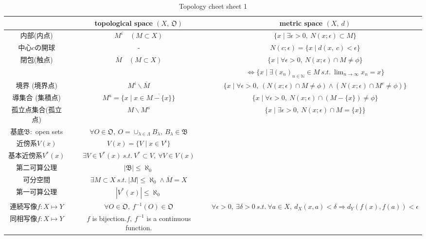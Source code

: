 \documentclass[b4paper,landscape,english,dvipdfmx]{jsarticle}
\begin{document}
\begin{table}[h]
    \caption{Topology cheet sheet 1}
    \begin{center}
    \begin{tabular}{|c||c|c|} \hline
    & topological space $( X,\ \mathfrak{O})$ & metric space $( X,\ d)$ \\ \hline
    内部(内点) & $M^i \quad ( M \subset X )$ & $\{ x \mid \exists \epsilon > 0,\ N(x;\epsilon) \subset M \}$ \\ \hline
    中心$c$の開球 & - & $N(c;\epsilon) = \{ x \mid d(x,\ c) < \epsilon \}$\\ \hline
    \multirow{2}{*}{閉包(触点)} & \multirow{2}{*}{$\overline{M} \quad ( M \subset X )$} & $ \{ x \mid \forall \epsilon > 0,\ N(x;\epsilon) \cap M \neq \phi \}$ \\
    & & $ \Leftrightarrow \{ x \mid \exists (x_n)_{n \in \mathbb{N}} \in M \ s.t. \ \lim_{n \to \infty} x_n = x \}$ \\ \hline
    境界 (境界点) & $M^i \backslash \overline{M}$ & $\{ x \mid \forall \epsilon > 0,\ (N(x;\epsilon) \cap M \neq \phi) \land  (N(x;\epsilon) \cap M^c \neq \phi) \}$ \\ \hline
    導集合 (集積点) & $M^a = \{ x \mid x \in \overline{ M - \{ x \}} \}$ & $\{ x \mid \forall \epsilon > 0,\ N(x;\epsilon) \cap (M - \{ x \}) \neq \phi \}$  \\ \hline
    孤立点集合(孤立点) & $M \backslash M^a$ & $\{ x \mid \exists \epsilon > 0,\ N(x;\epsilon) \cap M = \{ x \} \} $ \\ \hline
    基底$\mathfrak{B} :$ open sets & $\forall O \in \mathfrak{O},\ O = \cup_{\lambda \in \Lambda} B_{\lambda},\ B_{\lambda} \in \mathfrak{B}$ & \\ \hline
    近傍系$V(x)$  & $V(x) = \{ V \mid x \in V^i \}$ & \\ \hline
    基本近傍系$V^*(x)$ & $\exists V \in V^*(x) \ s.t. \ V^* \subset V,\ \forall V \in V(x)$ & \\ \hline
    第二可算公理 & $|\mathfrak{B}| \leq \aleph_0 $ & \\ \cline{1-2}
    可分空間 & $\exists M \subset X \ s.t. \ |M| \leq \aleph_0 \land \overline{M} = X$ & \\ \hline
    第一可算公理 & $|V^*(x)| \leq \aleph_0 $ & \\ \hline
    連続写像$f: X \mapsto Y$ & $\forall O \in \mathfrak{O},\ f^{-1}(O) \in \mathfrak{O}$ & $\forall \epsilon > 0,\ \exists \delta > 0 \ s.t. \ \forall a \in X,\ d_X(x,a) < \delta \Rightarrow d_Y(f(x),f(a)) < \epsilon$ \\ \hline
    同相写像$f: X \mapsto Y$ & $f$ is bijection.$f,\ f^{-1}$ is a continuous function. & \\ \hline
    \end{tabular}
    \end{center}
\end{table}
\end{document}
